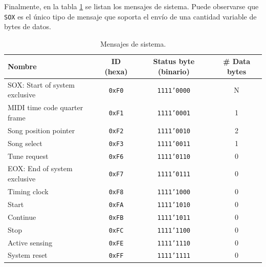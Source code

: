 Finalmente, en la tabla \ref{tab:system-messages} se listan los mensajes de sistema. Puede observarse que \texttt{SOX} es el único tipo de mensaje que soporta el envío de una cantidad variable de bytes de datos.
\begin{table}[h]
	\centering
	\caption[Mensajes de sistema.]{Mensajes de sistema.}
	\label{tab:system-messages}
	\resizebox{\textwidth}{!}
	{
	\begin{tabular}{lccc}
		\toprule
		\textbf{Nombre}                & \textbf{ID (hexa)} & \textbf{Status byte (binario)} & \textbf{\# Data bytes} \\
		\midrule
		SOX: Start of system exclusive & \texttt{0xF0}      & \texttt{1111'0000}             & N                      \\
		MIDI time code quarter frame   & \texttt{0xF1}      & \texttt{1111'0001}             & 1                      \\
		Song position pointer          & \texttt{0xF2}      & \texttt{1111'0010}             & 2                      \\
		Song select                    & \texttt{0xF3}      & \texttt{1111'0011}             & 1                      \\
		Tune request                   & \texttt{0xF6}      & \texttt{1111'0110}             & 0                      \\
		EOX: End of system exclusive   & \texttt{0xF7}      & \texttt{1111'0111}             & 0                      \\
		Timing clock                   & \texttt{0xF8}      & \texttt{1111'1000}             & 0                      \\
		Start                          & \texttt{0xFA}      & \texttt{1111'1010}             & 0                      \\
		Continue                       & \texttt{0xFB}      & \texttt{1111'1011}             & 0                      \\
		Stop                           & \texttt{0xFC}      & \texttt{1111'1100}             & 0                      \\
		Active sensing                 & \texttt{0xFE}      & \texttt{1111'1110}             & 0                      \\
		System reset                   & \texttt{0xFF}      & \texttt{1111'1111}             & 0                      \\
		\bottomrule
		\hline
	\end{tabular}
	}
\end{table}


